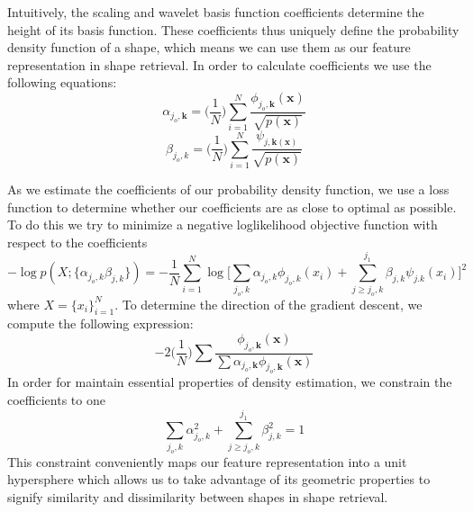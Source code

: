 \documentclass[../tech_report_1.tex]{subfiles}
\begin{document}
Intuitively, the scaling and wavelet basis
function coefficients determine the height of its basis function.
These coefficients thus uniquely define
the probability density function of a shape, which means we can use them as our feature representation
in shape retrieval. In order to calculate coefficients we use the
following equations:
\begin{equation}
\alpha_{j_{o},\mathbf{k}}=\bigg(\frac{1}{N}\bigg)\overset{N}{\underset{i=1}{\sum}}\frac{\phi_{j_{o},\mathbf{k}}(\mathbf{x})}{\sqrt{p(\mathbf{x})}}\label{eq:scalingCoeff}
\end{equation}
\begin{equation}
\beta_{j_{o},k}=\bigg(\frac{1}{N}\bigg)\underset{i=1}{\overset{N}{\sum}}\frac{\psi_{j,\mathbf{k}(\mathbf{x})}}{\sqrt{p(\mathbf{x})}}\label{eq:waveletCoeff}
\end{equation}

As we estimate the coefficients of our probability density function,
we use a loss function to determine whether our coefficients are as
close to optimal as possible. To do this we try to minimize a negative
loglikelihood objective function with respect to the coefficients
\begin{equation}
-\log p(X;\{\alpha_{j_{o},k}\beta_{j,k}\})=-\frac{1}{N}\underset{i=1}{\overset{N}{\sum}}\log\Bigg[\underset{j_{o},k}{\sum}\alpha_{j_{o},k}\phi_{j_{o},k}(x_{i})+\underset{j\geq j_{o},k}{\overset{j_{1}}{\sum}}\beta_{j,k}\psi_{j.k}(x_{i})\Bigg]^{2}\label{eq:costFunction}
\end{equation}
where $X=\{x_{i}\}_{i=1}^{N}$. To determine the direction
of the gradient descent, we compute the following expression:
\begin{equation}
-2\bigg(\frac{1}{N}\bigg)\sum\frac{\phi_{j_{o},\mathbf{k}}(\mathbf{x})}{\sum\alpha_{j_{o},\mathbf{k}}\phi_{j_{o},\mathbf{k}}(\mathbf{x})}\label{eq:gradient}
\end{equation}
In order for maintain essential properties of density estimation,
we constrain the coefficients to one
\begin{equation}
\underset{j_{o},k}{\sum}\alpha_{j_{o},k}^{2}+\underset{j\geq j_{o},k}{\overset{j_{1}}{\sum}}\beta_{j,k}^{2}=1\label{eq:constraint}
\end{equation}
This constraint conveniently maps our feature representation into
a unit hypersphere which allows us to take advantage of its geometric
properties to signify similarity and dissimilarity between shapes
in shape retrieval. 
\end{document}
